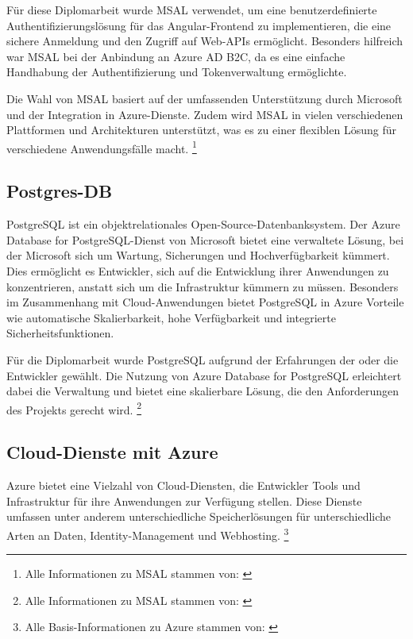 Für diese Diplomarbeit wurde MSAL verwendet, um eine benutzerdefinierte Authentifizierungslösung 
für das Angular-Frontend zu implementieren, die eine sichere Anmeldung und den Zugriff auf 
Web-APIs ermöglicht. Besonders hilfreich war MSAL bei der Anbindung an Azure AD B2C, da es 
eine einfache Handhabung der Authentifizierung und Tokenverwaltung ermöglichte.

Die Wahl von MSAL basiert auf der umfassenden Unterstützung durch Microsoft und der 
Integration in Azure-Dienste. Zudem wird MSAL in vielen verschiedenen Plattformen und 
Architekturen unterstützt, was es zu einer flexiblen Lösung für verschiedene Anwendungsfälle 
macht.
\footnote{Alle Informationen zu MSAL stammen von: \cite{MicrosoftCorporationr}}

\subsection{Postgres-DB}
\label{subsection:postgres_db}

PostgreSQL ist ein objektrelationales Open-Source-Datenbanksystem. Der Azure Database for 
PostgreSQL-Dienst von Microsoft bietet eine verwaltete Lösung, bei der Microsoft sich 
um Wartung, Sicherungen und Hochverfügbarkeit kümmert. Dies ermöglicht es Entwickler, 
sich auf die Entwicklung ihrer Anwendungen zu konzentrieren, anstatt sich um die 
Infrastruktur kümmern zu müssen. Besonders im Zusammenhang mit Cloud-Anwendungen 
bietet PostgreSQL in Azure Vorteile wie automatische Skalierbarkeit, hohe Verfügbarkeit 
und integrierte Sicherheitsfunktionen.

Für die Diplomarbeit wurde PostgreSQL aufgrund der Erfahrungen der oder die Entwickler gewählt. 
Die Nutzung von Azure Database for PostgreSQL erleichtert dabei die Verwaltung und 
bietet eine skalierbare Lösung, die den Anforderungen des Projekts gerecht wird.
\footnote{Alle Informationen zu MSAL stammen von: \cite{MicrosoftCorporations}}

\subsection{Cloud-Dienste mit Azure}

Azure bietet eine Vielzahl von Cloud-Diensten, die Entwickler Tools und Infrastruktur 
für ihre Anwendungen zur Verfügung stellen. Diese Dienste umfassen 
unter anderem unterschiedliche Speicherlösungen für unterschiedliche Arten an Daten, 
Identity-Management und Webhosting.
\footnote{Alle Basis-Informationen zu Azure stammen von: \cite{MicrosoftCorporationt}}

